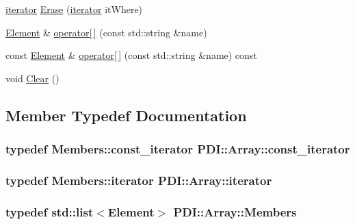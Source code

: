 \begin{CompactItemize}
\item 
\hyperlink{class_p_d_i_1_1_array_ea216852e304c9b15049c0e595378d1d}{iterator} \hyperlink{class_p_d_i_1_1_array_131c705ff2cf178d505e62c1f8801b67}{Erase} (\hyperlink{class_p_d_i_1_1_array_ea216852e304c9b15049c0e595378d1d}{iterator} itWhere)
\item 
\hyperlink{class_p_d_i_1_1_element}{Element} \& \hyperlink{class_p_d_i_1_1_array_1d3f248c3f8ec6e42e9633bafad51797}{operator\mbox{[}$\,$\mbox{]}} (const std::string \&name)
\item 
const \hyperlink{class_p_d_i_1_1_element}{Element} \& \hyperlink{class_p_d_i_1_1_array_6195970cb8f192b39dc764456abfa8f0}{operator\mbox{[}$\,$\mbox{]}} (const std::string \&name) const 
\item 
void \hyperlink{class_p_d_i_1_1_array_c0d7acf6d14997afb0f93b08db683d11}{Clear} ()
\end{CompactItemize}


\subsection{Member Typedef Documentation}
\hypertarget{class_p_d_i_1_1_array_3e4335ca32c34f7fd22e00e3aedc3e7f}{
\subsubsection[{const\_\-iterator}]{\setlength{\rightskip}{0pt plus 5cm}typedef Members::const\_\-iterator {\bf PDI::Array::const\_\-iterator}}}
\label{class_p_d_i_1_1_array_3e4335ca32c34f7fd22e00e3aedc3e7f}


\hypertarget{class_p_d_i_1_1_array_ea216852e304c9b15049c0e595378d1d}{
\subsubsection[{iterator}]{\setlength{\rightskip}{0pt plus 5cm}typedef Members::iterator {\bf PDI::Array::iterator}}}
\label{class_p_d_i_1_1_array_ea216852e304c9b15049c0e595378d1d}


\hypertarget{class_p_d_i_1_1_array_033a904ed48718f6531f260830e2ed3e}{
\subsubsection[{Members}]{\setlength{\rightskip}{0pt plus 5cm}typedef std::list$<${\bf Element}$>$ {\bf PDI::Array::Members}}}
\label{class_p_d_i_1_1_array_033a904ed48718f6531f260830e2ed3e}




